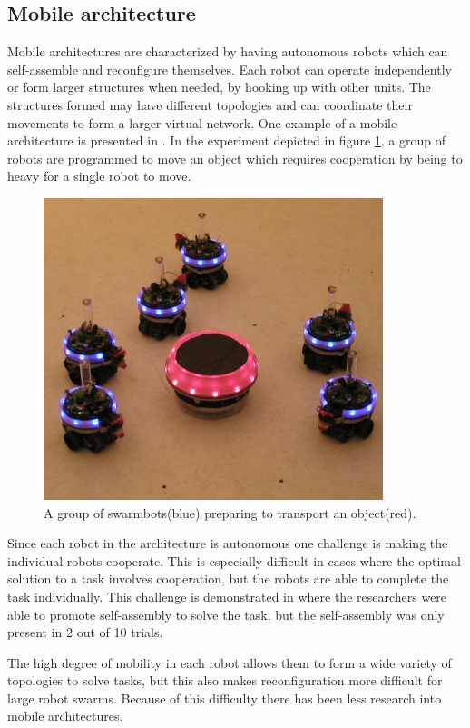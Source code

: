 \subsection{Mobile architecture}
Mobile architectures are characterized by having autonomous robots which can self-assemble and reconfigure themselves.
Each robot can operate independently or form larger structures when needed, by hooking up with other units.
The structures formed may have different topologies and can coordinate their movements to form a larger virtual network\cite{yim_modular_2007}.
One example of a mobile architecture is presented in \cite{gross_object_2006}.
In the experiment depicted in figure \ref{fig:swarmbot-object-transport}, a group of robots are programmed  to move an object which requires cooperation by being to heavy for a single robot to move.

\begin{figure}[H]
	\centering
	\includegraphics{chapters/res/MobileObjectTransport.png}
	\caption{A group of swarmbots(blue) preparing to transport an object(red)\cite{gro_autonomous_2006}.}
	\label{fig:swarmbot-object-transport}
\end{figure}
Since each robot in the architecture is autonomous one challenge is making the individual robots cooperate.
This is especially difficult in cases where the optimal solution to a task involves cooperation, but the robots are able to complete the task individually.
This challenge is demonstrated in \cite{trianni_evolving_2004} where the researchers were able to promote self-assembly to solve the task, but the self-assembly was only present in 2 out of 10 trials.

The high degree of mobility in each robot allows them to form a wide variety of topologies to solve tasks, but this also makes reconfiguration more difficult for large robot swarms.
Because of this difficulty there has been less research into mobile architectures.


